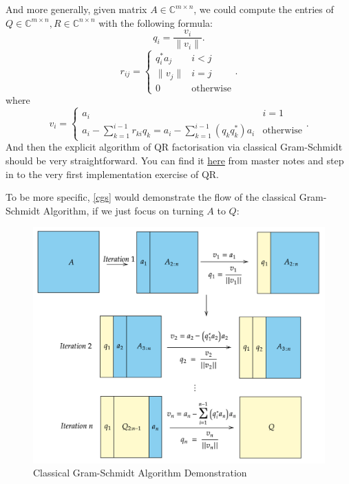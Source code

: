 \noindent And more generally, given matrix \(A \in \mathbb{C}^{m \times n}\), we could compute the entries of \(Q \in \mathbb{C}^{m \times  n}, R \in \mathbb{C}^{n \times  n}\) with the following formula:
\[
  q_i = \frac{v_{i}}{\|v_{i}\|}
.\]
\[
  r_{ij} = \left\{
    \begin{array}{ll}
    q_{i}^{*}a_{j} & i < j\\
    \|v_{j}\| & i = j\\
    0 & \text{otherwise}
    \end{array}
  \right.
.\]
where
\[
  v_{i} = \left\{
      \begin{array}{ll}
      a_{i} & i = 1\\
      a_{i} - \sum_{k=1}^{i - 1} r_{ki}q_{k} = a_{i} - \sum_{k=1}^{i - 1} (q_{k}q_{k}^{*})a_{i} & \text{otherwise}
      \end{array}
  \right.
.\]
And then the explicit algorithm of QR factorisation via classical Gram-Schmidt should be very straightforward. You can find it \href{https://comp-lin-alg.github.io/L2_QR_factorisation.html#qr-factorisation-by-classical-gram-schmidt-algorithm}{here} from master notes and step in to the very first implementation exercise of QR.
\newpage

\noindent To be more specific, \autoref{cgs} would demonstrate the flow of the classical Gram-Schmidt Algorithm, if we just focus on turning \(A\) to \(Q\): 
\begin{figure}[htp]
  \centering
  \includegraphics[width=\textwidth]{imgs/cgs.png}
  \caption{Classical Gram-Schmidt Algorithm Demonstration}
  \label{cgs}
\end{figure}
